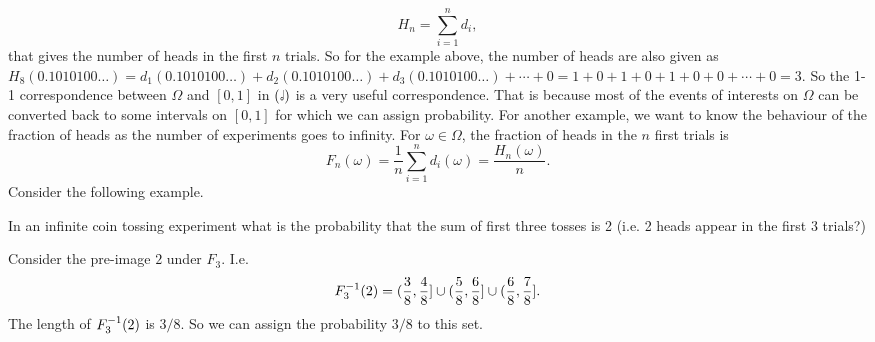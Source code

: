 \[ H_n = \sum_{i=1}^n d_i, \]
that gives the number of heads in the first $ n $ trials. So for the example above, the number of heads are also given as $ H_8(0.1010100\dots) = d_1(0.1010100\dots) + d_2(0.1010100\dots) + d_3(0.1010100\dots) + \cdots + 0 = 1 + 0 + 1 + 0 + 1 + 0 + 0 + \cdots + 0  = 3 $. So the 1-1 correspondence between $ \Omega $ and $ [0,1] $ in $ (\halfnote) $ is a very useful correspondence. That is because most of the events of interests on $ \Omega $ can be converted back to some intervals on $ [0,1] $ for which we can assign probability. For another example, we want to know the behaviour of the fraction of heads as the number of experiments goes to infinity. For $ \omega \in \Omega $, the fraction of heads in the $ n $ first trials is
\[ F_n(\omega) = \frac{1}{n}\sum_{i=1}^{n} d_i(\omega) = \frac{H_n(\omega)}{n}. \]
Consider the following example.
\begin{example}
	In an infinite coin tossing experiment what is the probability that the sum of first three tosses is 2 (i.e. 2 heads appear in the first 3 trials?)
\end{example}
\begin{solution}
	Consider the pre-image $ 2 $ under $ F_3 $. I.e.
	\[ F_3^{-1}(2) = (\frac{3}{8},\frac{4}{8}] \cup (\frac{5}{8},\frac{6}{8}] \cup (\frac{6}{8},\frac{7}{8}]. \]
	The length of $ F_3^{-1}(2) $ is $ 3/8 $. So we can assign the probability $ 3/8 $ to this set. 
\end{solution}

